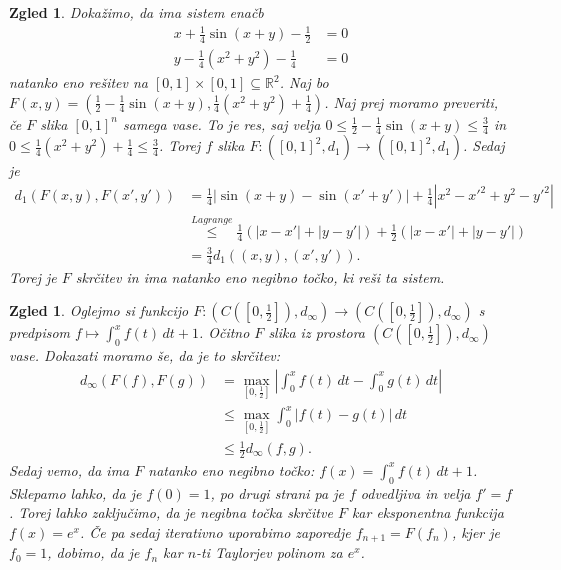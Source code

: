 \documentclass[10pt, a4paper]{article}
\newtheorem{zgled}[izr]{Zgled}
\newcommand{\R}{\mathbb {R}}
\begin{document}
\begin{zgled}
    Dokažimo, da ima sistem enačb 
    \begin{align*}
        x + \frac{1}{4} \sin (x+y) - \frac{1}{2} &= 0\\
        y - \frac{1}{4} \left(x^2 + y^2 \right) - \frac{1}{4} &= 0
    \end{align*}
    natanko eno rešitev na $[0, 1] \times [0, 1] \subseteq \R^2$.
    Naj bo $F(x,y) = \left( \frac{1}{2} - \frac{1}{4} \sin (x+y), \frac{1}{4} \left(x^2 + y^2 \right) + \frac{1}{4} \right)$.
    Naj prej moramo preveriti, če $F$ slika $[0, 1]^n$ samega vase.
    To je res, saj velja $0 \leq \frac{1}{2} - \frac{1}{4} \sin (x+y) \leq \frac{3}{4}$ in 
    $0\leq \frac{1}{4} \left(x^2 + y^2 \right) + \frac{1}{4} \leq \frac{3}{4}$.
    Torej $f$ slika $F: \left([0,1]^2, d_1 \right) \rightarrow \left([0,1]^2, d_1 \right)$.
    Sedaj je \begin{align*}
        d_1 (F(x,y), F(x',y')) &= \frac{1}{4} \left| \sin (x+y) - \sin (x' + y') \right| + \frac{1}{4} \left| x^2 - x'^2 + y^2 - y'^2 \right|\\
        &\stackrel{Lagrange}{\leq} \frac{1}{4} \left( |x-x'| + |y-y'| \right) + \frac{1}{2} \left( |x-x'| + |y-y'| \right)\\
        &= \frac{3}{4} d_1 ((x,y), (x',y')).
    \end{align*}
    Torej je $F$ skrčitev in ima natanko eno negibno točko, ki reši ta sistem.
\end{zgled}

\begin{zgled}
    Oglejmo si funkcijo $F: \left(C\left(\left[0, \frac{1}{2} \right]\right), d_\infty \right) \rightarrow \left(C\left(\left[0, \frac{1}{2} \right]\right), d_\infty \right)$ 
    s predpisom $f \mapsto \int_0 ^x f(t)\,dt + 1$.
    Očitno $F$ slika iz prostora $\left(C\left(\left[0, \frac{1}{2} \right]\right), d_\infty \right)$ vase.
    Dokazati moramo še, da je to skrčitev:
    \begin{align*}
        d_\infty (F(f), F(g)) &= \max_{\left[0, \frac{1}{2}\right]} \left| \int_0 ^x f(t)\,dt - \int_0 ^x g(t)\,dt \right|\\
        &\leq \max_{\left[0, \frac{1}{2}\right]}  \int_0 ^x \left|f(t)- g(t)\right|\,dt \\
        &\leq \frac{1}{2} d_\infty (f, g).
    \end{align*}
    Sedaj vemo, da ima $F$ natanko eno negibno točko: $f(x) = \int_0 ^x f(t)\,dt + 1$.
    Sklepamo lahko, da je $f(0) = 1$, po drugi strani pa je $f$ odvedljiva in velja $f' = f$.
    Torej lahko zaključimo, da je negibna točka skrčitve $F$ kar eksponentna funkcija $f(x) = e^x$.
    Če pa sedaj iterativno uporabimo zaporedje $f_{n+1} = F(f_n)$, kjer je $f_0 = 1$,
    dobimo, da je $f_n$ kar $n$-ti Taylorjev polinom za $e^x$.
\end{zgled}
\end{document}
